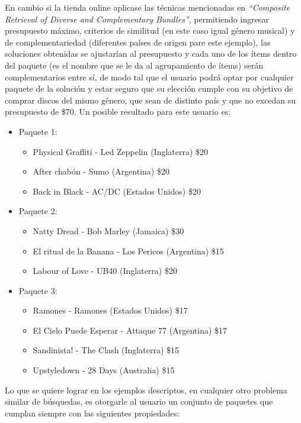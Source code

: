 En cambio si la tienda online aplicase las técnicas mencionadas en \textit{``Composite Retrieval of Diverse and Complementary Bundles''}, permitiendo ingresar presupuesto máximo, criterios de similitud (en este caso igual género musical) y de complementariedad (diferentes países de origen pare este ejemplo), las soluciones obtenidas se ajustarían al presupuesto y cada uno de los ítems dentro del paquete (es el nombre que se le da al agrupamiento de ítems) serán complementarios entre sí, de modo tal que el usuario podrá optar por cualquier paquete de la solución y estar seguro que su elección cumple con su objetivo de comprar discos del mismo género, que sean de distinto país y que no excedan su presupuesto de \$70. Un posible resultado para este usuario es:
\begin{itemize}
  \item Paquete 1:
  \begin{itemize}
    \item Physical Graffiti - Led Zeppelin (Inglaterra) \$20
    \item After chabón - Sumo (Argentina) \$20
    \item Back in Black - AC/DC (Estados Unidos) \$20
  \end{itemize}
  \item Paquete 2:
  \begin{itemize}
    \item Natty Dread - Bob Marley (Jamaica) \$30
    \item El ritual de la Banana - Los Pericos (Argentina) \$15
    \item Labour of Love - UB40 (Inglaterra) \$20
  \end{itemize}
	  \item Paquete 3:
  \begin{itemize}
    \item Ramones - Ramones (Estados Unidos) \$17
    \item El Cielo Puede Esperar - Attaque 77 (Argentina) \$17
    \item Sandinista! - The Clash (Inglaterra) \$15
	\item Upstyledown - 28 Days (Australia) \$15
  \end{itemize}
\end{itemize}
Lo que se quiere lograr en los ejemplos descriptos, en cualquier otro problema similar de búsquedas, es otorgarle al usuario un conjunto de paquetes que cumplan siempre con las siguientes propiedades: 
